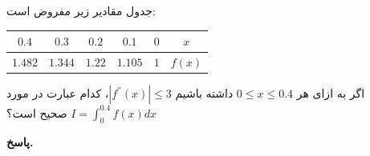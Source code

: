 جدول مقادیر زیر مفروض است:
\vspace*{-.5cm}
\begin{center}
		\begin{tabular}{ccccc|c}
		\(0.4\) & \(0.3\) &\(0.2\)&\(0.1\) & \(0\) & \(x\)\\
		\midrule
		\(1.482\)	& \(1.344\) & \(1.22\) & \(1.105\) &\( 1\) & \(f(x)\)
	\end{tabular}
\end{center}
اگر به ازای هر 
\(0\leq x \leq 0.4\)
داشته باشیم
\(|f^{''}(x)| \leq 3\)،
 کدام عبارت در مورد 
\(I = \int_{0}^{0.4} f(x) dx\)
صحیح است؟

\begin{answer}

	\textbf{پاسخ.}
	
\end{answer}
